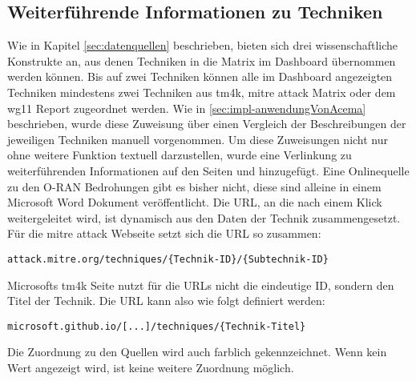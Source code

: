 \subsection{Weiterführende Informationen zu Techniken}
\par Wie in Kapitel \ref{sec:datenquellen} beschrieben, bieten sich drei wissenschaftliche Konstrukte an, aus denen Techniken in die Matrix im Dashboard übernommen werden können. Bis auf zwei Techniken können alle im Dashboard angezeigten Techniken mindestens zwei Techniken aus \gls{tm4k}, \gls{mitre} \gls{attack} Matrix oder dem \gls{wg11} Report zugeordnet werden. Wie in \ref{sec:impl-anwendungVonAcema} beschrieben, wurde diese Zuweisung über einen Vergleich der Beschreibungen der jeweiligen Techniken manuell vorgenommen.
Um diese Zuweisungen nicht nur ohne weitere Funktion textuell darzustellen, wurde eine Verlinkung zu weiterführenden Informationen auf den Seiten \autocite{MITREATTCK} und \autocite{TacticsThreatMatrix} hinzugefügt. Eine Onlinequelle zu den O-RAN Bedrohungen gibt es bisher nicht, diese sind alleine in einem Microsoft Word Dokument veröffentlicht. Die URL, an die nach einem Klick weitergeleitet wird, ist dynamisch aus den Daten der Technik zusammengesetzt. Für die \gls{mitre} \gls{attack} Webseite setzt sich die URL so zusammen: \par \verb|attack.mitre.org/techniques/{Technik-ID}/{Subtechnik-ID}|
\par Microsofts \gls{tm4k} Seite nutzt für die URLs nicht die eindeutige ID, sondern den Titel der Technik. Die URL kann also wie folgt definiert werden: \par \verb|microsoft.github.io/[...]/techniques/{Technik-Titel}|
\par Die Zuordnung zu den Quellen wird auch farblich gekennzeichnet. Wenn kein Wert angezeigt wird, ist keine weitere Zuordnung möglich.
